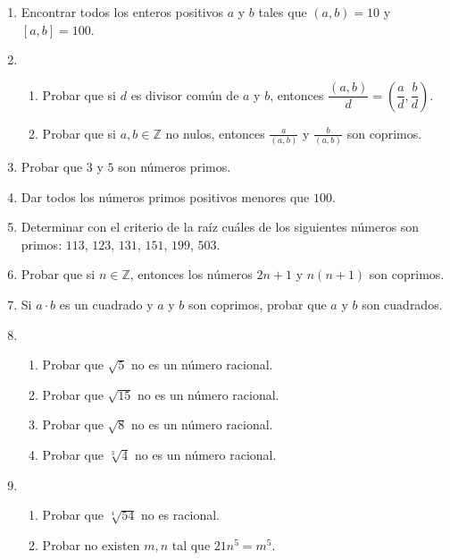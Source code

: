 \documentclass[a4paper,12pt,twoside,spanish,reqno]{amsbook}
\numberwithin{equation}{section}
\begin{document}
\begin{enumerate}
\item Encontrar todos los enteros positivos $a$ y $b$ tales que $(a,b)=10$ y $[a,b]=100$.


\item
    \begin{enumerate}
        \item Probar que si $d$ es divisor común de $a$ y $b$, entonces $\dfrac{(a,b)}{d} = \left(\dfrac{a}{d}, \dfrac{b}{d}\right)$.
        \item Probar que si $a,b\in \mathbb Z$ no nulos, entonces  $\displaystyle \frac a{(a,b)}$ y $\displaystyle \frac b{(a,b)}$ son coprimos.
    \end{enumerate}


\item Probar que $3$  y $5$ son números primos.


\item  Dar todos los números primos positivos menores que $100$.


\item Determinar con el criterio de la raíz  cuáles de los siguientes números son primos: $113$, $123$, $131$, $151$, $199$, $503$.


\item Probar que si $n \in {\mathbb Z}$, entonces los números $2n+1$ y $n(n+1)$ son coprimos.


\item Si $a\cdot b$ es un cuadrado y $a$ y $b$ son coprimos, probar que $a$ y $b$ son cuadrados.


\item 
    \begin{enumerate}
        \item Probar  que $\sqrt{5}$ no es un número racional.   
        \item Probar  que $\sqrt{15}$ no es un número racional.  
        \item Probar  que $\sqrt{8}$ no es un número racional.  
        \item Probar  que $\sqrt[3]{4}$ no es un número racional.
    \end{enumerate}

\item  
    \begin{enumerate}
        \item Probar  que $\sqrt[4]{54}$ no es racional. 
        \item Probar no existen $m, n$ tal que $21 n^5 = m^5$. 
    \end{enumerate}


\end{enumerate}
\end{document}
